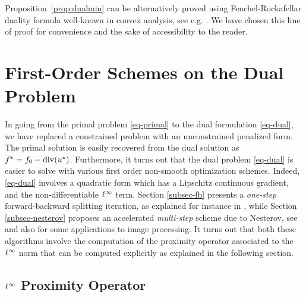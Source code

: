 \documentclass[11pt,nofonttune,a4paper]{IEEEtran}
\newcommand{\uk}{u^{(k)}}
\begin{document}
\begin{rem}
Proposition~\ref{prop:dualmin} can be alternatively proved using Fenchel-Rockafellar duality formula well-known in convex analysis, see e.g. \cite[Section III.4]{Ekeland74}. We have chosen this line of proof for convenience and the sake of accessibility to the reader.
\end{rem}

\section{First-Order Schemes on the Dual Problem}
\label{sec-1storder}

In going from the primal problem \eqref{eq-primal} to the dual formulation \eqref{eq-dual}, we have replaced a constrained problem with an unconstrained penalized form. The primal solution is easily recovered from the dual solution as $f^\star = f_0 - \operatorname{div}(u^\star)$. Furthermore, it turns out that the dual problem \eqref{eq-dual} is easier to solve with various first order non-smooth optimization schemes. Indeed, \eqref{eq-dual} involves a quadratic form which has a Lipschitz continuous gradient, and the non-differentiable $\ell^\infty$ term. Section \ref{subsec-fb} presents a \textit{one-step} forward-backward splitting iteration, as explained for instance in \cite{Tseng91,combettes-splitting}, while Section \ref{subsec-nesterov} proposes an accelerated \textit{multi-step} scheme due to Nesterov, see \cite{nesterov-gradient} and also \cite{weiss-tv-nesterov} for some applications to image processing. It turns out that both these algorithms involve the computation of the proximity operator associated to the $\ell^\infty$ norm that can be computed explicitly as explained in the following section.


\subsection{$\ell^\infty$ Proximity Operator}
\label{subsec-proximal}
\end{document}
